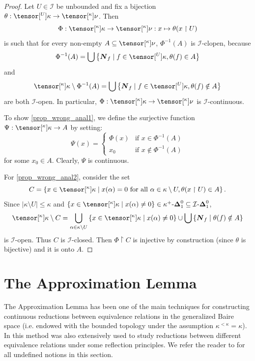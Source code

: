 \documentclass{amsart}
\numberwithin{equation}{section}
\newcommand{\I}{\mathcal{I}}
\newcommand{\pre}[2]{\tensor[^{#1}]{#2}{}}
\newcommand{\Nbhd}{\boldsymbol{N}}
\newcommand{\1}{\mathbf{I}}
\newcommand{\2}{\mathbf{II}}
\newcommand{\Dee}[2]{\k^+\text{-}\boldsymbol{\Delta}^{ #1 }_{ #2}}
\newcommand{\Deid}[2]{\I\text{-}\boldsymbol{\Delta}^{ #1 }_{ #2}}
\renewcommand{\a}{\alpha}
\renewcommand{\k}{\kappa}
\theoremstyle{definition}
\theoremstyle{remark}
\begin{document}
\begin{proof}
Let \(U\in \I\) be unbounded and fix a bijection \(\theta:\pre{U}{\k} \rightarrow \pre{\k}{\nu}\). Then  
\[
\Phi:\pre{\k}{\k} \rightarrow \pre{\k}{\nu}: x \mapsto \theta(x\restriction {U})
\] 
is such that for every non-empty \(A \subseteq \pre{\k}{\nu}\), \(\Phi^{-1}(A)\) is \(\I\)-clopen, because 
\[
\Phi^{-1}(A)=\bigcup \left\lbrace \Nbhd_f \mid f \in \pre{U}{\k}, \theta(f) \in A \right\rbrace 
\] 
and
\[ 
\pre{\k}{\k} \setminus \Phi^{-1}(A)=\bigcup \left\lbrace \Nbhd_f \mid f \in \pre{U}{\k}, \theta(f) \notin A \right\rbrace 
\] 
are both \(\I\)-open. In particular, \(\Phi:\pre{\k}{\k} \rightarrow \pre{\k}{\nu}\) is \(\I\)-continuous. 

To show \ref{prop_wrong_anal1}, we define the surjective function \(\Psi: \pre{\k}{\k} \to A \) by setting:
 \begin{equation*}
\Psi(x)=
\begin{cases}
\Phi(x) & \text{if \(x \in \Phi^{-1}(A)\)} \\
x_0 & \text{if \(x \notin \Phi^{-1}(A)\)}
\end{cases} 
\end{equation*} for some \(x_0 \in A\). Clearly, \(\Psi\) is continuous. 

For \ref{prop_wrong_anal2}, consider the set 
\[
C=\left\lbrace x \in \pre{\k}{\k} \mid x(\a) = 0 \text{ for all } \a \in \k\setminus U, \theta(x \restriction U) \in A \right\rbrace.
\] 
Since \(|\k\setminus U|\leq \k\) and \(\left\lbrace x \in \pre{\k}{\k} \mid x(\a) \neq 0  \right\rbrace \in \Dee{0}{1} \subseteq \Deid{0}{1}\), \[
\pre{\k}{\k}\setminus C=\bigcup_{\a \in \k\setminus U} \left\lbrace x \in \pre{\k}{\k} \mid x(\a) \neq 0  \right\rbrace \cup \bigcup \left\lbrace \Nbhd_f \mid \theta(f)\notin A \right\rbrace
\]
is \(\I\)-open. Thus \(C\) is \(\I\)-closed.
Then \(\Phi\restriction C\) is injective by construction (since \(\theta\) is bijective) and it is onto \(A\).
\end{proof}



\section{The Approximation Lemma}\label{section_approx}

The Approximation Lemma has been one of the main techniques for constructing continuous reductions between equivalence relations in the generalized Baire space (i.e. endowed with the bounded topology under the assumption $\kappa^{<\kappa}=\kappa$). 
In \cite{FMR21} this method was also extensively used to study reductions between different equivalence relations under some reflection principles. We refer the reader to \cite{FMR21} for all undefined notions in this section. 
\end{document}
